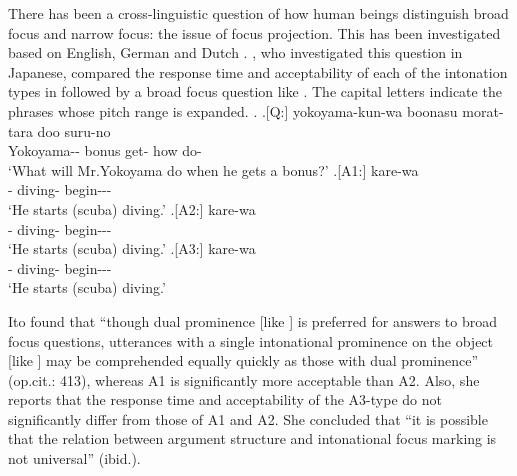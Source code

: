 There has been a cross-linguistic question of how
human beings distinguish broad focus and narrow focus:
the issue of focus projection.
This has been investigated based on English, German and Dutch
\cite{selkirk84,gussenhoven83}.
, who investigated this question in Japanese,
compared the response time and acceptability of each of the intonation types in \Next[A1-A3]
followed by a broad focus question like \Next[Q].
The capital letters indicate the phrases whose pitch range is expanded.
\ex.
 \ag.[Q:] yokoyama-kun-wa boonasu morat-tara doo suru-no \\
          Yokoyama-- bonus get- how do- \\
          `What will Mr.Yokoyama do when he gets a bonus?'
 \bg.[A1:] kare-wa   \\
           - diving- begin--- \\
           `He starts (scuba) diving.'
 \bg.[A2:] kare-wa   \\
           - diving- begin--- \\
           `He starts (scuba) diving.'
 \bg.[A3:] kare-wa   \\
           - diving- begin--- \\
           `He starts (scuba) diving.'
      \hfill{\cite[412]{ito02}}

Ito found that
``though dual prominence [like \Last[A1]] is preferred for answers to broad focus questions,
utterances with a single intonational prominence on the object [like \Last[A2]] may be comprehended equally quickly as those with dual prominence'' (op.cit.: 413),
whereas A1 is significantly more acceptable than A2.
Also, she reports that the response time and acceptability of the A3-type do not significantly differ from those of A1 and A2.
She concluded that
``it is possible that the relation between argument structure and intonational focus marking is not universal'' (ibid.).

